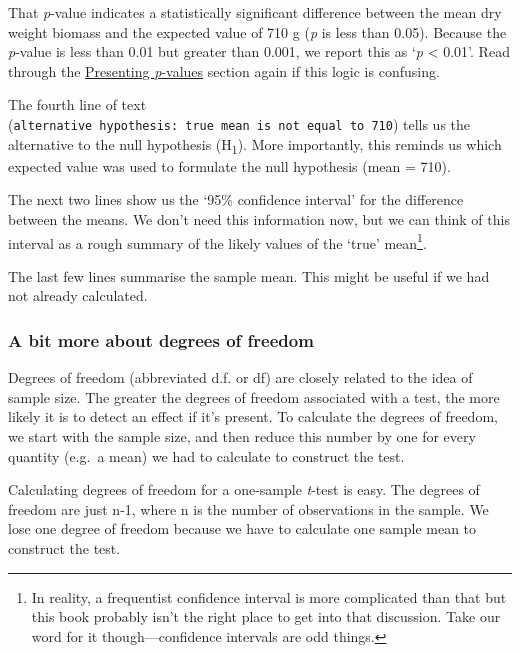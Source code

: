 \documentclass[
]{book}
\newenvironment{greybox}{
  \definecolor{shadecolor}{rgb}{0.95,0.95,0.95}  %
  \color{black}
  \begin{shaded}}
 {\end{shaded}}
\newenvironment{infobox}[1]
  {
  \begin{itemize}
  \renewcommand{\labelitemi}{
    \raisebox{-.7\height}[0pt][0pt]{
      {\setkeys{Gin}{width=3em,keepaspectratio}
        \texttt{[image: images/\#1]}}
    }
  }
  \setlength{\fboxsep}{1em}
  \begin{greybox}
  \item
  }
  {
  \end{greybox}
  \end{itemize}
  }
\begin{document}
That \emph{p}-value indicates a statistically significant difference between the mean dry weight biomass and the expected value of 710 g (\emph{p} is less than 0.05). Because the \emph{p}-value is less than 0.01 but greater than 0.001, we report this as `\emph{p} \textless{} 0.01'. Read through the \protect\hyperlink{presenting-p-values}{Presenting \emph{p}-values} section again if this logic is confusing.

The fourth line of text (\texttt{alternative\ hypothesis:\ true\ mean\ is\ not\ equal\ to\ 710}) tells us the alternative to the null hypothesis (H\textsubscript{1}). More importantly, this reminds us which expected value was used to formulate the null hypothesis (mean = 710).

The next two lines show us the `95\% confidence interval' for the difference between the means. We don't need this information now, but we can think of this interval as a rough summary of the likely values of the `true' mean\footnote{In reality, a frequentist confidence interval is more complicated than that but this book probably isn't the right place to get into that discussion. Take our word for it though---confidence intervals are odd things.}.

The last few lines summarise the sample mean. This might be useful if we had not already calculated.

\begin{infobox}{information}

\hypertarget{a-bit-more-about-degrees-of-freedom}{%
\subsubsection*{A bit more about degrees of freedom}\label{a-bit-more-about-degrees-of-freedom}}

Degrees of freedom (abbreviated d.f. or df) are closely related to the idea of sample size. The greater the degrees of freedom associated with a test, the more likely it is to detect an effect if it's present. To calculate the degrees of freedom, we start with the sample size, and then reduce this number by one for every quantity (e.g.~a mean) we had to calculate to construct the test.

Calculating degrees of freedom for a one-sample \emph{t}-test is easy. The degrees of freedom are just n-1, where n is the number of observations in the sample. We lose one degree of freedom because we have to calculate one sample mean to construct the test.

\end{infobox}
\end{document}
